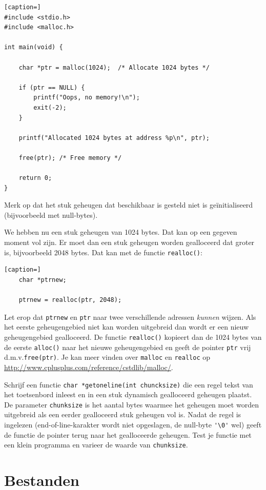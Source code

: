 \documentclass[a4paper,10pt,fleqn,twoside]{article}
\begin{document}
\begin{lstlisting}[caption=]
#include <stdio.h>
#include <malloc.h>

int main(void) {

	char *ptr = malloc(1024);  /* Allocate 1024 bytes */

	if (ptr == NULL) {
		printf("Oops, no memory!\n");
		exit(-2);
	}

	printf("Allocated 1024 bytes at address %p\n", ptr);

	free(ptr); /* Free memory */

	return 0;
}
\end{lstlisting}

Merk op dat het stuk geheugen dat beschikbaar is gesteld niet is geïnitialiseerd (bijvoorbeeld met null-bytes).

We hebben nu een stuk geheugen van 1024 bytes. Dat kan op een gegeven moment vol zijn. Er moet dan een stuk geheugen worden gealloceerd dat groter is, bijvoorbeeld 2048 bytes. Dat kan met de functie \lstinline|realloc()|:

\begin{lstlisting}[caption=]
	char *ptrnew;

	ptrnew = realloc(ptr, 2048);
\end{lstlisting}

Let erop dat \lstinline|ptrnew| en \lstinline|ptr| naar twee verschillende adressen \textsl{kunnen} wijzen. Als het eerste geheugengebied niet kan worden uitgebreid dan wordt er een nieuw geheugengebied gealloceerd. De functie \lstinline|realloc()| kopieert dan de 1024 bytes van de eerste \lstinline|alloc()| naar het nieuwe geheugengebied en geeft de pointer \lstinline|ptr| vrij d.m.v.\@ \lstinline|free(ptr)|. Je kan meer vinden over \lstinline|malloc| en \lstinline|realloc| op 
\url{http://www.cplusplus.com/reference/cstdlib/malloc/}.

Schrijf een functie \lstinline|char *getoneline(int chuncksize)| die een regel tekst van het toetsenbord inleest en in een stuk dynamisch gealloceerd geheugen plaatst. De parameter \lstinline|chunksize| is het aantal bytes waarmee het geheugen moet worden uitgebreid als een eerder gealloceerd stuk geheugen vol is. Nadat de regel is ingelezen (end-of-line-karakter wordt niet opgeslagen, de null-byte \lstinline|'\0'| wel) geeft de functie de pointer terug naar het gealloceerde geheugen. Test je functie met een klein programma en varieer de waarde van \lstinline|chunksize|.


\clearpage
\section{Bestanden}
\end{document}
